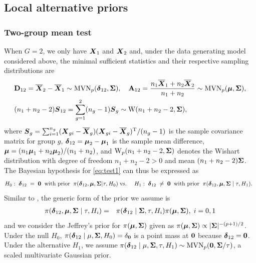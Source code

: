 \documentclass[pdflatex,sn-basic]{sn-jnl}%
\newcommand{\uzero}            {\mbox{\boldmath$0$}}
\def\MVN{\hbox{MVN}}
\def\Wish{\hbox{W}}
\def\be{\begin{eqnarray}}
\def\ee{\end{eqnarray}}
\def\trans{^{\rm T}}
\def\bA{{\mathbf A}}
\def\bD{{\mathbf D}}
\newcommand{\uS}       {\mbox{\boldmath$S$}}
\newcommand{\uX}       {\mbox{\boldmath$X$}}
\newcommand{\udelta}            {\mbox{\boldmath$\delta$}}
\newcommand{\umu}               {\mbox{\boldmath$\mu$}}
\newcommand{\uSigma}            {\mbox{\boldmath$\Sigma$}}
\theoremstyle{thmstyleone}%
\theoremstyle{thmstyletwo}%
\theoremstyle{thmstylethree}%
\begin{document}
\subsection{Local alternative priors}

\subsubsection{Two-group mean test}
When $G=2$, we only have $\uX_1$ and $\uX_2$ and, under the data generating model considered above, the minimal sufficient statistics and their respective sampling distributions are 
\begin{align*}
&\bD_{12} = \overline{\uX}_2 - \overline{\uX}_1 \sim \MVN_{p}(\udelta_{12}, \uSigma), \quad \bA_{12} = 
\frac{n_1\overline{\uX}_1 + n_2\overline{\uX}_2}{n_1+n_2} \sim \MVN_{p}(\umu, \uSigma),\\
&(n_1+n_2-2)\uS_{12} = \sum^{2}_{g=1}(n_g - 1)\uS_g \sim \Wish(n_1+n_2-2, \uSigma), 
\end{align*}
where $\uS_g = \sum^{n_g}_{i=1}(\uX_{gi} - \overline{\uX}_g)(\uX_{gi} - \overline{\uX}_g)\trans /(n_g - 1)$ is the sample covariance matrix for group $g$, $\udelta_{12} = \umu_2 - \umu_1$ is the sample mean difference, $\umu = (n_1\umu_1 + n_2\umu_2)/(n_1+n_2)$, and $\Wish_{p}(n_1+n_2-2,\uSigma)$ denotes the Wishart distribution with degree of freedom $n_1+n_2-2 > 0$ and mean $(n_1 + n_2-2)\uSigma$. 
The Bayesian hypothesis for \eqref{eq:test1} can thus be expressed as
\be
H_0:\; \udelta_{12}\; = \; \uzero\;\; \mbox{with prior} \;\; \pi(\udelta_{12}, \umu, \uSigma | \tau, H_{0}) \;  &\mbox{vs.}& \;
 H_1: \; \udelta_{12} \; \neq \; \uzero\;\;\mbox{with prior} \;\; \pi(\udelta_{12}, \umu, \uSigma \mid \tau, H_{1}) .\;\; \label{eq:hyp1} 
\ee
Similar to \cite{zoh2018powerful}, the generic form of the prior we assume is 
\be
\pi(\udelta_{12}, \umu,\uSigma \mid \tau, H_i) &=& \pi(\udelta_{12} \mid \uSigma, \tau, H_{i})\pi(\umu, \uSigma),\;i=0,1 \label{eq:priorE1}
\ee
and we consider the Jeffrey's prior for $\pi(\umu, \uSigma)$ given as $\pi(\umu, \uSigma) \propto |\uSigma|^{-(p+1)/2}$. Under the null $H_0$, $\pi(\udelta_{12}\mid\mathbf{\mu}, \uSigma, H_0) = \delta_{\mathbf{0}}$ is a point mass at $\uzero$ because $\udelta_{12} = \uzero$. Under the alternative $H_1$, we assume $\pi(\udelta_{12} \mid \mathbf{\mu}, \uSigma, \tau, H_1) \sim \MVN_{p}(\uzero, \uSigma/\tau)$, a scaled multivariate Gaussian prior.    
\end{document}
